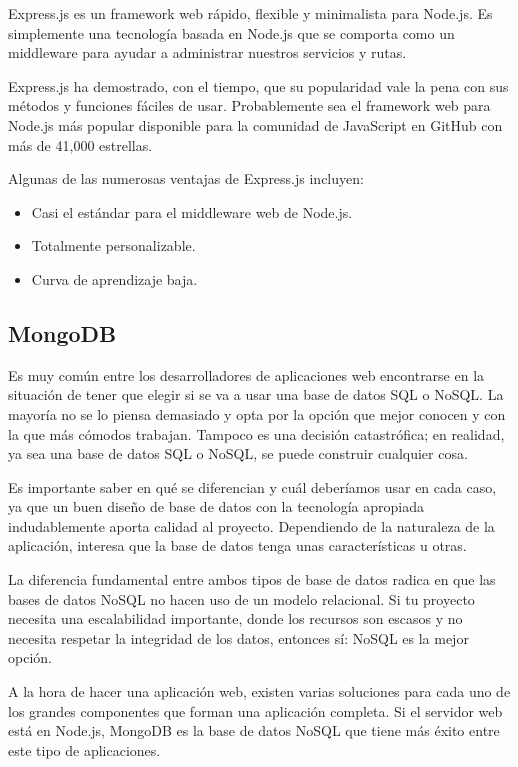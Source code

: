 Express.js es un framework web rápido, flexible y minimalista para Node.js. Es simplemente una tecnología basada en Node.js que se comporta como un middleware para ayudar a administrar nuestros servicios y rutas.

Express.js ha demostrado, con el tiempo, que su popularidad vale la pena con sus métodos y funciones fáciles de usar. Probablemente sea el framework web para Node.js más popular disponible para la comunidad de JavaScript en GitHub con más de 41,000 estrellas.

Algunas de las numerosas ventajas de Express.js incluyen:

\begin{itemize}
  \item Casi el estándar para el middleware web de Node.js.
  \item Totalmente personalizable.
  \item Curva de aprendizaje baja.
\end{itemize}

\subsection{MongoDB}

Es muy común entre los desarrolladores de aplicaciones web encontrarse en la situación de tener que elegir si se va a usar una base de datos SQL o NoSQL. La mayoría no se lo piensa demasiado y opta por la opción que mejor conocen y con la que más cómodos trabajan. Tampoco es una decisión catastrófica; en realidad, ya sea una base de datos SQL o NoSQL, se puede construir cualquier cosa.

Es importante saber en qué se diferencian y cuál deberíamos usar en cada caso, ya que un buen diseño de base de datos con la tecnología apropiada indudablemente aporta calidad al proyecto. Dependiendo de la naturaleza de la aplicación, interesa que la base de datos tenga unas características u otras.

La diferencia fundamental entre ambos tipos de base de datos radica en que las bases de datos NoSQL no hacen uso de un modelo relacional. Si tu proyecto necesita una escalabilidad importante, donde los recursos son escasos y no necesita respetar la integridad de los datos, entonces sí: NoSQL es la mejor opción.

A la hora de hacer una aplicación web, existen varias soluciones para cada uno de los grandes componentes que forman una aplicación completa. Si el servidor web está en Node.js, MongoDB es la base de datos NoSQL que tiene más éxito entre este tipo de aplicaciones.

